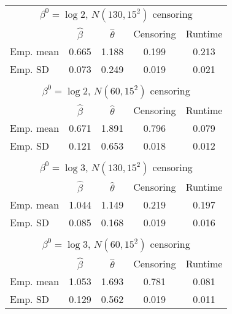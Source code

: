 \documentclass[english]{article}
\providecommand{\tabularnewline}{\\}
\begin{document}
\begin{table}
{\protect\centering{}%
\begin{tabular}{l|c|c|c|c|}
\multicolumn{5}{c}{$\beta^{0}=\log2$, $N(130,15^{2})$ censoring}\tabularnewline
\cline{2-5} 
 & $\hat{\beta}$ & $\hat{\theta}$ & Censoring & Runtime\tabularnewline
\hline 
\multicolumn{1}{|l|}{Emp. mean} & 0.665 & 1.188 & 0.199 & 0.213\tabularnewline
\hline 
\multicolumn{1}{|l|}{Emp. SD} & 0.073 & 0.249 & 0.019 & 0.021\tabularnewline
\hline 
\multicolumn{1}{l}{} & \multicolumn{1}{c}{} & \multicolumn{1}{c}{} & \multicolumn{1}{c}{} & \multicolumn{1}{c}{}\tabularnewline
\multicolumn{5}{c}{$\beta^{0}=\log2$, $N(60,15^{2})$ censoring}\tabularnewline
\cline{2-5} 
 & $\hat{\beta}$ & $\hat{\theta}$ & Censoring & Runtime\tabularnewline
\hline 
\multicolumn{1}{|l|}{Emp. mean} & 0.671 & 1.891 & 0.796 & 0.079\tabularnewline
\hline 
\multicolumn{1}{|l|}{Emp. SD} & 0.121 & 0.653 & 0.018 & 0.012\tabularnewline
\hline 
\multicolumn{1}{l}{} & \multicolumn{1}{c}{} & \multicolumn{1}{c}{} & \multicolumn{1}{c}{} & \multicolumn{1}{c}{}\tabularnewline
\multicolumn{5}{c}{$\beta^{0}=\log3$, $N(130,15^{2})$ censoring}\tabularnewline
\cline{2-5} 
 & $\hat{\beta}$ & $\hat{\theta}$ & Censoring & Runtime\tabularnewline
\hline 
\multicolumn{1}{|l|}{Emp. mean} & 1.044 & 1.149 & 0.219 & 0.197\tabularnewline
\hline 
\multicolumn{1}{|l|}{Emp. SD} & 0.085 & 0.168 & 0.019 & 0.016\tabularnewline
\hline 
\multicolumn{1}{l}{} & \multicolumn{1}{c}{} & \multicolumn{1}{c}{} & \multicolumn{1}{c}{} & \multicolumn{1}{c}{}\tabularnewline
\multicolumn{5}{c}{$\beta^{0}=\log3$, $N(60,15^{2})$ censoring}\tabularnewline
\cline{2-5} 
 & $\hat{\beta}$ & $\hat{\theta}$ & Censoring & Runtime\tabularnewline
\hline 
\multicolumn{1}{|l|}{Emp. mean} & 1.053 & 1.693 & 0.781 & 0.081\tabularnewline
\hline 
\multicolumn{1}{|l|}{Emp. SD} & 0.129 & 0.562 & 0.019 & 0.011\tabularnewline
\hline 
\end{tabular}\protect}\hfill{}
\end{table}
\end{document}
